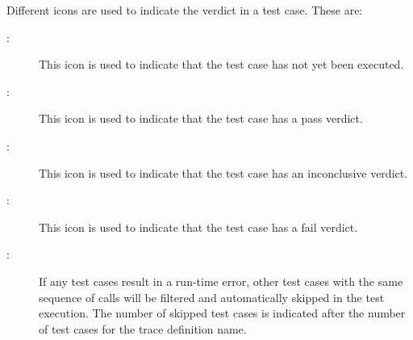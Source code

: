 \documentclass{overturerepchap}
\begin{document}
Different icons are used to indicate the verdict in a test
case. These are:
\begin{description}
\item[\hspace{-1.8mm}
:]
  This icon is used to indicate that the test case has not yet been
  executed.
\item[\hspace{-1.8mm}
:]
  This icon is used to indicate that the test case has a pass
  verdict.
\item[\hspace{-1.8mm}
:]
  This icon is used to indicate that the test case has an inconclusive
  verdict.
\item[\hspace{-1.8mm}
:]
  This icon is used to indicate that the test case has a fail
  verdict.
\item[\hspace{-1.8mm}
:] 
If any test cases result in a run-time error, other test cases with the
same sequence of calls will be filtered and automatically skipped in the test
execution. The number of skipped test cases is indicated after the number
of test cases for the trace definition name.
\end{description}
\end{document}
